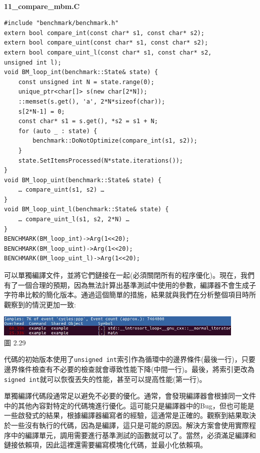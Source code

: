 \hspace*{\fill} \\ %
\noindent
\textbf{11\_compare\_mbm.C}
\begin{lstlisting}[style=styleCXX]
#include "benchmark/benchmark.h"
extern bool compare_int(const char* s1, const char* s2);
extern bool compare_uint(const char* s1, const char* s2);
extern bool compare_uint_l(const char* s1, const char* s2,
unsigned int l);
void BM_loop_int(benchmark::State& state) {
	const unsigned int N = state.range(0);
	unique_ptr<char[]> s(new char[2*N]);
	::memset(s.get(), 'a', 2*N*sizeof(char));
	s[2*N-1] = 0;
	const char* s1 = s.get(), *s2 = s1 + N;
	for (auto _ : state) {
		benchmark::DoNotOptimize(compare_int(s1, s2));
	}
	state.SetItemsProcessed(N*state.iterations());
}
void BM_loop_uint(benchmark::State& state) {
	… compare_uint(s1, s2) …
}
void BM_loop_uint_l(benchmark::State& state) {
	… compare_uint_l(s1, s2, 2*N) …
}
BENCHMARK(BM_loop_int)->Arg(1<<20);
BENCHMARK(BM_loop_uint)->Arg(1<<20);
BENCHMARK(BM_loop_uint_l)->Arg(1<<20);
\end{lstlisting}

可以單獨編譯文件，並將它們鏈接在一起(必須關閉所有的程序優化)。現在，我們有了一個合理的預期，因為無法計算出基準測試中使用的參數，編譯器不會生成子字符串比較的簡化版本。通過這個簡單的措施，結果就與我們在分析整個項目時所觀察到的情況更加一致:

\begin{center}
\includegraphics[width=0.9\textwidth]{content/1/chapter2/images/29.jpg}\\
圖 2.29
\end{center}

代碼的初始版本使用了\texttt{unsigned int}索引作為循環中的邊界條件(最後一行)，只要邊界條件檢查有不必要的檢查就會導致性能下降(中間一行)。最後，將索引更改為\texttt{signed int}就可以恢復丟失的性能，甚至可以提高性能(第一行)。

單獨編譯代碼段通常足以避免不必要的優化。通常，會發現編譯器會根據同一文件中的其他內容對特定的代碼塊進行優化。這可能只是編譯器中的Bug，但也可能是一些啟發式的結果，根據編譯器編寫者的經驗，這通常是正確的。觀察到結果取決於一些沒有執行的代碼，因為是編譯，這只是可能的原因。解決方案會使用實際程序中的編譯單元，調用需要進行基準測試的函數就可以了。當然，必須滿足編譯和鏈接依賴項，因此這裡還需要編寫模塊化代碼，並最小化依賴項。

